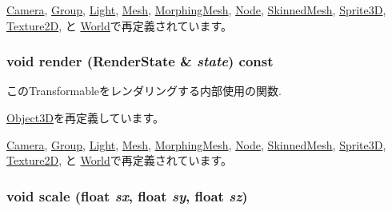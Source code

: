 \hyperlink{classm3g_1_1Camera_6fea17fa1532df3794f8cb39cb4f911f}{Camera}, \hyperlink{classm3g_1_1Group_6fea17fa1532df3794f8cb39cb4f911f}{Group}, \hyperlink{classm3g_1_1Light_6fea17fa1532df3794f8cb39cb4f911f}{Light}, \hyperlink{classm3g_1_1Mesh_6fea17fa1532df3794f8cb39cb4f911f}{Mesh}, \hyperlink{classm3g_1_1MorphingMesh_6fea17fa1532df3794f8cb39cb4f911f}{MorphingMesh}, \hyperlink{classm3g_1_1Node_6fea17fa1532df3794f8cb39cb4f911f}{Node}, \hyperlink{classm3g_1_1SkinnedMesh_6fea17fa1532df3794f8cb39cb4f911f}{SkinnedMesh}, \hyperlink{classm3g_1_1Sprite3D_6fea17fa1532df3794f8cb39cb4f911f}{Sprite3D}, \hyperlink{classm3g_1_1Texture2D_6fea17fa1532df3794f8cb39cb4f911f}{Texture2D}, と \hyperlink{classm3g_1_1World_6fea17fa1532df3794f8cb39cb4f911f}{World}で再定義されています。\hypertarget{classm3g_1_1Transformable_8babc8a79b78615da51161e94029eea9}{
\subsubsection[{render}]{\setlength{\rightskip}{0pt plus 5cm}void render ({\bf RenderState} \& {\em state}) const}}
\label{classm3g_1_1Transformable_8babc8a79b78615da51161e94029eea9}


このTransformableをレンダリングする内部使用の関数. 

\hyperlink{classm3g_1_1Object3D_8babc8a79b78615da51161e94029eea9}{Object3D}を再定義しています。

\hyperlink{classm3g_1_1Camera_8babc8a79b78615da51161e94029eea9}{Camera}, \hyperlink{classm3g_1_1Group_8babc8a79b78615da51161e94029eea9}{Group}, \hyperlink{classm3g_1_1Light_8babc8a79b78615da51161e94029eea9}{Light}, \hyperlink{classm3g_1_1Mesh_8babc8a79b78615da51161e94029eea9}{Mesh}, \hyperlink{classm3g_1_1MorphingMesh_8babc8a79b78615da51161e94029eea9}{MorphingMesh}, \hyperlink{classm3g_1_1Node_8babc8a79b78615da51161e94029eea9}{Node}, \hyperlink{classm3g_1_1SkinnedMesh_8babc8a79b78615da51161e94029eea9}{SkinnedMesh}, \hyperlink{classm3g_1_1Sprite3D_8babc8a79b78615da51161e94029eea9}{Sprite3D}, \hyperlink{classm3g_1_1Texture2D_8babc8a79b78615da51161e94029eea9}{Texture2D}, と \hyperlink{classm3g_1_1World_8babc8a79b78615da51161e94029eea9}{World}で再定義されています。\hypertarget{classm3g_1_1Transformable_d94deaf828db5e2dfd5e40db42b64cd9}{
\subsubsection[{scale}]{\setlength{\rightskip}{0pt plus 5cm}void scale (float {\em sx}, \/  float {\em sy}, \/  float {\em sz})}}
\label{classm3g_1_1Transformable_d94deaf828db5e2dfd5e40db42b64cd9}



